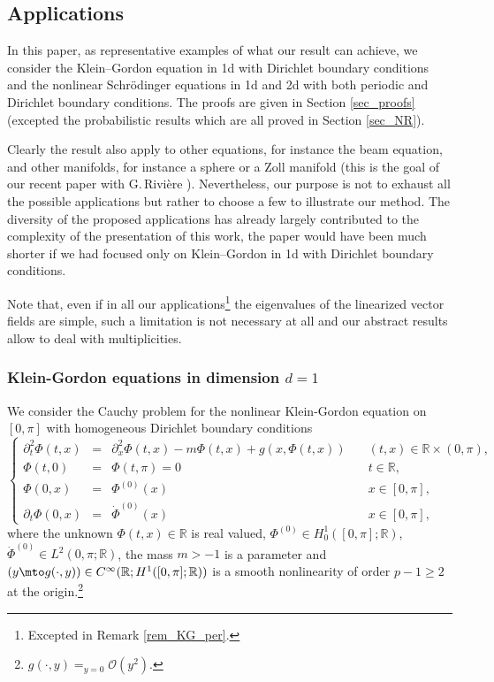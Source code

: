 \subsection{Applications}
In this paper, as representative examples of what our result can achieve, we consider the Klein--Gordon equation in 1d with Dirichlet boundary conditions and the nonlinear Schrödinger equations in 1d and 2d with both periodic and Dirichlet boundary conditions. The proofs are given in Section \ref{sec_proofs} (excepted the probabilistic results which are all proved in Section \ref{sec_NR}).

Clearly the result also apply to other equations, for instance the beam equation, and other manifolds, for instance a sphere or a Zoll manifold (this is the goal of our recent paper with G.\,Rivière \cite{BGR}). Nevertheless, our purpose is not to exhaust all the possible applications but rather to choose a few to illustrate our method. The diversity of the proposed applications has already largely contributed to the complexity of the presentation of this work, the paper would have been much shorter if we had focused only on Klein--Gordon in 1d with Dirichlet boundary conditions.

Note that, even if in all our applications\footnote{Excepted in Remark \ref{rem_KG_per}.} the eigenvalues of the linearized vector fields are simple, such a limitation is not necessary at all and our abstract results allow to deal with multiplicities.

\subsubsection{Klein-Gordon equations in dimension $d=1$}
\label{sub_sec_KG}
We consider the Cauchy problem for the nonlinear Klein-Gordon equation on $[0,\pi]$ with homogeneous Dirichlet boundary conditions
\begin{equation}
\label{eq_KG}
\tag{KG}
\left\{ \begin{array}{rclll} \partial_t^2 \Phi(t,x) &=& \partial_x^2 \Phi(t,x) - m \Phi(t,x) + g(x,\Phi(t,x)) & \quad(t,x)\in \mathbb{R}\times (0,\pi), \\
\Phi(t,0) &=& \Phi(t,\pi) = 0 & \quad t\in \mathbb{R}, \\
\Phi(0,x) &=& \Phi^{(0)}(x) & \quad x\in [0,\pi], \\
\partial_t \Phi(0,x) &=& \dot{\Phi}^{(0)}(x) & \quad x\in [0,\pi],
\end{array}
\right.
\end{equation}
where the unknown $\Phi(t,x)\in \mathbb{R}$ is real valued, $\Phi^{(0)} \in H^1_0([0,\pi];\mathbb{R})$, $\dot{\Phi}^{(0)} \in L^2(0,\pi;\mathbb{R})$, the mass $m>-1$ is a parameter and $(y \mto g(\cdot,y)) \in C^\infty(\mathbb{R}; H^{1}([0,\pi];\mathbb{R}))$ is a smooth nonlinearity of order $p-1\geq 2$ at the origin.\footnote{ \ie $\displaystyle g(\cdot,y) \mathop{=}_{y=0} \mathcal{O}(y^2)$.}

